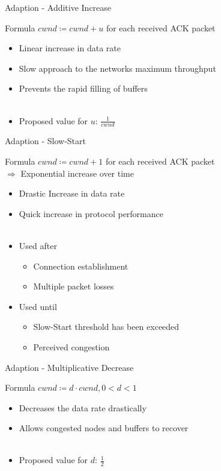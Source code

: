 \documentclass[english,aspectratio=43,t]{beamer}
\begin{document}
\begin{frame}{Adaption - Additive Increase}
~\\
\begin{block}{Formula}
$cwnd \coloneqq cwnd + u$ for each received ACK packet
\end{block}
\begin{itemize}
\item Linear increase in data rate
\item Slow approach to the networks maximum throughput
\item Prevents the rapid filling of buffers
~\\~\\
\item<2-> Proposed value for $u$: $\frac{1}{cwnd}$
\end{itemize}
\end{frame}

\begin{frame}{Adaption - Slow-Start}
~\\
\begin{block}{Formula}
$cwnd \coloneqq cwnd + 1$ for each received ACK packet
\\$\Rightarrow$ Exponential increase over time
\end{block}
\begin{itemize}
\item Drastic Increase in data rate
\item Quick increase in protocol performance
~\\~\\
\item<2-> Used after
	\begin{itemize}
	\item Connection establishment
	\item Multiple packet losses
	\end{itemize}
\item<3-> Used until
	\begin{itemize}
	\item Slow-Start threshold has been exceeded
	\item Perceived congestion
	\end{itemize}
\end{itemize}
\end{frame}

\begin{frame}{Adaption - Multiplicative Decrease}
~\\
\begin{block}{Formula}
$cwnd \coloneqq d \cdot cwnd, 0<d<1$
\end{block}
\begin{itemize}
\item Decreases the data rate drastically
\item Allows congested nodes and buffers to recover
~\\~\\
\item<2-> Proposed value for $d$: $\frac{1}{2}$
\end{itemize}
\end{frame}
\end{document}
